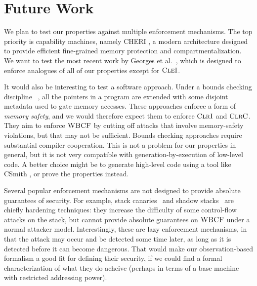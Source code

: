 \documentclass[10pt,conference]{ieeetran}%
\theoremstyle{definition}
\begin{document}

\section{Future Work}
\label{sec:future}

We plan to test our properties against multiple enforcement mechanisms.
The top priority is capability machines, namely 
CHERI \cite{DBLP:conf/sp/WatsonWNMACDDGL15}, a modern architecture designed
to provide efficient fine-grained
memory protection and compartmentalization.
%
We want to test the most recent work by Georges et
al.~\cite{Georges22:TempsDesCerises}, which is designed
to enforce analogues of all of our properties except for \(\textnormal{\sc CleI}\).

It would also be interesting to test a software approach.
Under a bounds checking discipline~%
\cite{NagarakatteZMZ09}, all the pointers
in a program are extended with some disjoint metadata %
used
to gate memory accesses. These approaches enforce a form of \emph{memory safety},
and we would therefore expect them to enforce \(\textnormal{\sc ClrI}\) and \(\textnormal{\sc ClrC}\). They aim
to enforce \(\textnormal{\sc WBCF}\) by cutting off attacks that involve memory-safety violations,
but that may not be sufficient.
Bounds checking approaches require substantial compiler cooperation. This is not a
problem for our properties in general, but it is not very compatible with
generation-by-execution of low-level code. A better choice might be to generate
high-level code using a tool like CSmith \cite{DBLP:conf/pldi/YangCER11}, or prove the properties instead.

Several popular enforcement mechanisms are not designed to provide
absolute guarantees of security. For example, stack canaries~\cite{Cowan+98}
and shadow stacks~\cite{Dang+15,Shanbhogue+19}
are chiefly hardening techniques: they increase the difficulty
of some control-flow attacks on the stack, but cannot provide absolute
guarantees on \(\textnormal{\sc WBCF}\) under a normal attacker model.
%
Interestingly, these are lazy enforcement mechanisms, in that
the attack may occur and be detected some time later, as long as
it is detected before it can become dangerous. That would make our
observation-based formalism a good fit for defining their security,
if we could find a formal characterization of what they do acheive
(perhaps in terms of a base machine with restricted addressing power).
\end{document}

